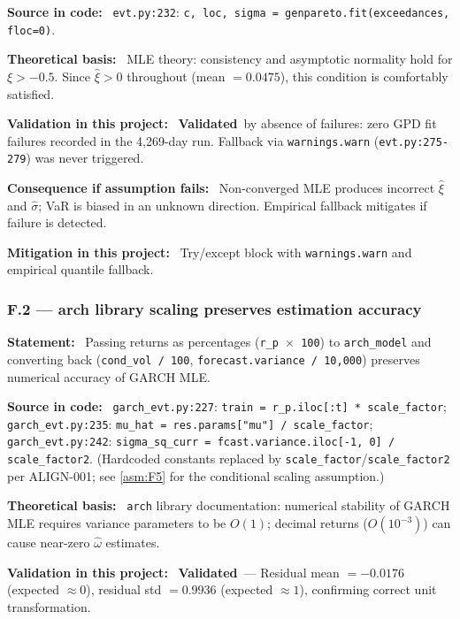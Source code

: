\documentclass[11pt,a4paper]{article}
\newcommand{\asmfield}[1]{\medskip\noindent\textbf{#1:}\ }
\newcommand{\code}[1]{\texttt{#1}}
\newcommand{\validated}{\textbf{Validated}}
\begin{document}
\asmfield{Source in code}
\code{evt.py:232}: \lstinline|c, loc, sigma = genpareto.fit(exceedances, floc=0)|.

\asmfield{Theoretical basis}
MLE theory: consistency and asymptotic normality hold for $\xi > -0.5$.
Since $\hat{\xi} > 0$ throughout (mean $= 0.0475$), this condition is
comfortably satisfied.

\asmfield{Validation in this project}
\validated\ by absence of failures: zero GPD fit failures recorded in the
4{,}269-day run. Fallback via \code{warnings.warn} (\code{evt.py:275-279})
was never triggered.

\asmfield{Consequence if assumption fails}
Non-converged MLE produces incorrect $\hat{\xi}$ and $\hat{\sigma}$; VaR
is biased in an unknown direction. Empirical fallback mitigates if failure
is detected.

\asmfield{Mitigation in this project}
Try/except block with \code{warnings.warn} and empirical quantile fallback.

\subsubsection{F.2 --- arch library scaling preserves estimation accuracy}\label{asm:F2}

\asmfield{Statement}
Passing returns as percentages (\code{r\_p $\times$ 100}) to \code{arch\_model}
and converting back (\code{cond\_vol / 100}, \code{forecast.variance / 10{,}000})
preserves numerical accuracy of GARCH MLE.

\asmfield{Source in code}
\code{garch\_evt.py:227}: \lstinline|train = r_p.iloc[:t] * scale_factor|;
\code{garch\_evt.py:235}: \lstinline|mu_hat = res.params["mu"] / scale_factor|;
\code{garch\_evt.py:242}: \lstinline|sigma_sq_curr = fcast.variance.iloc[-1, 0] / scale_factor2|.
(Hardcoded constants replaced by \code{scale\_factor}/\code{scale\_factor2}
per ALIGN-001; see \cref{asm:F5} for the conditional scaling assumption.)

\asmfield{Theoretical basis}
\code{arch} library documentation: numerical stability of GARCH MLE
requires variance parameters to be $O(1)$; decimal returns ($O(10^{-3})$)
can cause near-zero $\hat{\omega}$ estimates.

\asmfield{Validation in this project}
\validated\ --- Residual mean $= -0.0176$ (expected $\approx 0$), residual
std $= 0.9936$ (expected $\approx 1$), confirming correct unit transformation.
\end{document}
